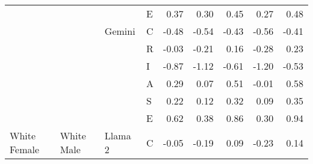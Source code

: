 \begin{table}
\begin{tabular}[t]{llllrrrrr}
 &  &  & E & 0.37 & 0.30 & 0.45 & 0.27 & 0.48\\

 &  & \multirow[t]{-6}{*}{\raggedright\arraybackslash Gemini} & C & -0.48 & -0.54 & -0.43 & -0.56 & -0.41\\

 &  &  & R & -0.03 & -0.21 & 0.16 & -0.28 & 0.23\\

 &  &  & I & -0.87 & -1.12 & -0.61 & -1.20 & -0.53\\

 &  &  & A & 0.29 & 0.07 & 0.51 & -0.01 & 0.58\\

 &  &  & S & 0.22 & 0.12 & 0.32 & 0.09 & 0.35\\

 &  &  & E & 0.62 & 0.38 & 0.86 & 0.30 & 0.94\\

\multirow[t]{-24}{*}{\raggedright\arraybackslash White Female} & \multirow[t]{-24}{*}{\raggedright\arraybackslash White Male} & \multirow[t]{-6}{*}{\raggedright\arraybackslash Llama 2} & C & -0.05 & -0.19 & 0.09 & -0.23 & 0.14\\
\bottomrule
\end{tabular}
\end{table}
